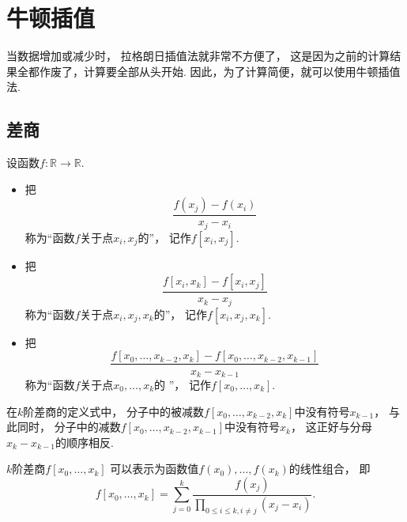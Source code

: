 \section{牛顿插值}
当数据增加或减少时，
拉格朗日插值法就非常不方便了，
这是因为之前的计算结果全都作废了，计算要全部从头开始.
因此，为了计算简便，就可以使用牛顿插值法.

\subsection{差商}
\begin{definition}
设函数\(f\colon \mathbb{R} \to \mathbb{R}\).
\begin{itemize}
	\item 把\begin{equation*}
		\frac{f(x_j) - f(x_i)}{x_j - x_i}
	\end{equation*}
	称为“函数\(f\)关于点\(x_i,x_j\)的”，
	记作\(f[x_i,x_j]\).

	\item 把\begin{equation*}
		\frac{f[x_i,x_k] - f[x_i,x_j]}{x_k - x_j}
	\end{equation*}
	称为“函数\(f\)关于点\(x_i,x_j,x_k\)的”，
	记作\(f[x_i,x_j,x_k]\).

	\item 把\begin{equation*}
		\frac{f[x_0,\dotsc,x_{k-2},x_k] - f[x_0,\dotsc,x_{k-2},x_{k-1}]}{x_k - x_{k-1}}
	\end{equation*}
	称为“函数\(f\)关于点\(x_0,\dotsc,x_k\)的 ”，
	记作\(f[x_0,\dotsc,x_k]\).
\end{itemize}
\end{definition}
\begin{remark}
在\(k\)阶差商的定义式中，
分子中的被减数\(f[x_0,\dotsc,x_{k-2},x_k]\)中没有符号\(x_{k-1}\)，
与此同时，
分子中的减数\(f[x_0,\dotsc,x_{k-2},x_{k-1}]\)中没有符号\(x_k\)，
这正好与分母\(x_k - x_{k-1}\)的顺序相反.
\end{remark}

\begin{property}
\(k\)阶差商\(f[x_0,\dotsc,x_k]\)
可以表示为函数值\(f(x_0),\dotsc,f(x_k)\)的线性组合，
即\begin{equation}
	f[x_0,\dotsc,x_k]
	= \sum_{j=0}^k
	\frac{f(x_j)}{
		\prod_{0 \leq i \leq k, i \neq j}
		(x_j - x_i)
	}.
\end{equation}
\end{property}

